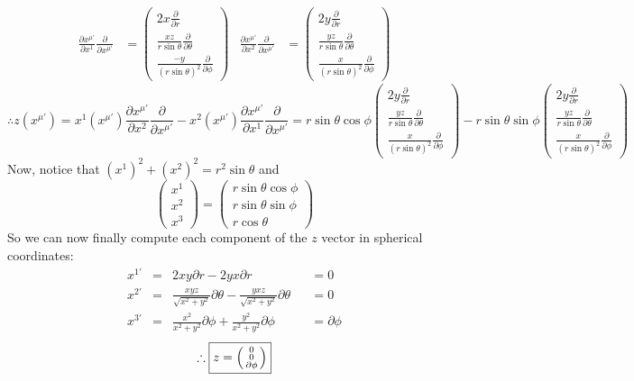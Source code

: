 \documentclass{article}
\begin{document}
 			\begin{align*}
 				\frac{\partial x^{\mu'}}{\partial x^1} \frac{\partial}{\partial x^{\mu'}} &= \begin{pmatrix}
 					2x \frac{\partial}{\partial r} \\
 					\frac{xz}{r\sin\theta}\frac{\partial}{\partial \theta} \\
 					\frac{-y}{(r\sin\theta)^2}\frac{\partial}{\partial \phi}
 				\end{pmatrix} & 
 				\frac{\partial x^{\mu'}}{\partial x^2} \frac{\partial}{\partial x^{\mu'}} &= \begin{pmatrix}
 					2y \frac{\partial}{\partial r} \\
 					\frac{yz}{r\sin\theta}\frac{\partial}{\partial \theta} \\
 					\frac{x}{(r\sin\theta)^2}\frac{\partial}{\partial \phi}
 				\end{pmatrix}
 			\end{align*}
 			$$ \therefore  z(x^{\mu'}) = x^1(x^{\mu'}) \frac{\partial x^{\mu'}}{\partial x^2} \frac{\partial}{\partial x^{\mu'}} - x^2 (x^{\mu '}) \frac{\partial x^{\mu'}}{\partial x^1}\frac{\partial }{\partial x^{\mu'}} = r\sin\theta\cos\phi \begin{pmatrix}
 				2y \frac{\partial}{\partial r} \\
 				\frac{yz}{r\sin\theta}\frac{\partial}{\partial \theta} \\
 				\frac{x}{(r\sin\theta)^2}\frac{\partial}{\partial \phi}
 			\end{pmatrix} - r\sin\theta\sin\phi \begin{pmatrix}
	 			2y \frac{\partial}{\partial r} \\
	 			\frac{yz}{r\sin\theta}\frac{\partial}{\partial \theta} \\
	 			\frac{x}{(r\sin\theta)^2}\frac{\partial}{\partial \phi}
 			\end{pmatrix}$$
 			Now, notice that $(x^1)^2 + (x^2)^2 = r^2 \sin\theta$ and
 			$$ 
 			\begin{pmatrix}
 				x^1 \\
 				x^2 \\
 				x^3
 			\end{pmatrix} = \begin{pmatrix}
 			r\sin\theta\cos\phi \\
 			r\sin\theta\sin\phi \\
 			r\cos\theta
 		\end{pmatrix}$$
 		So we can now finally compute each component of the $z$ vector in spherical coordinates:
 		\begin{align*}
 			x^{1'} &= &2xy \partial r - 2yx \partial r& &= 0 \\
 			x^{2'} &= &\frac{xyz}{\sqrt{x^2 + y^2}} \partial \theta - \frac{yxz}{\sqrt{x^2 + y^2}} \partial \theta& &= 0\\
 			x^{3'} &= &\frac{x^2}{x^2 + y^2} \partial \phi + \frac{y^2}{x^2 + y^2} \partial \phi& &= \partial \phi
 		\end{align*}
 		$$ \therefore \boxed{z = \begin{psmallmatrix}
 			0\\
 			0\\
 			\partial \phi
 		\end{psmallmatrix}}$$
\end{document}
